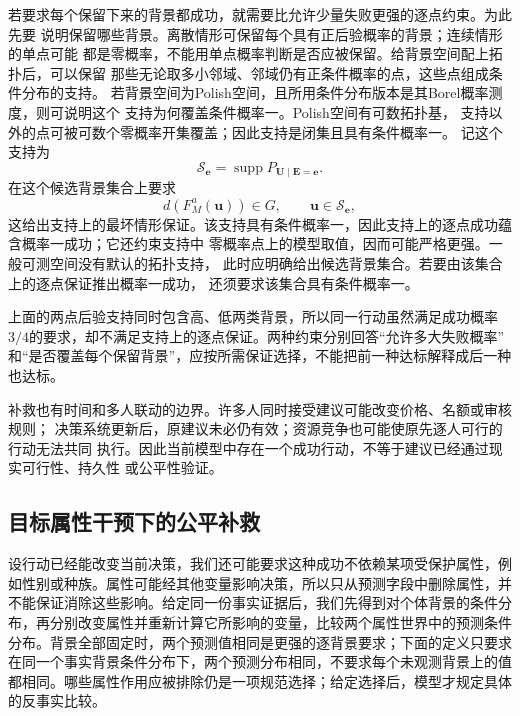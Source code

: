 若要求每个保留下来的背景都成功，就需要比允许少量失败更强的逐点约束。为此先要
说明保留哪些背景。离散情形可保留每个具有正后验概率的背景；连续情形的单点可能
都是零概率，不能用单点概率判断是否应被保留。给背景空间配上拓扑后，可以保留
那些无论取多小邻域、邻域仍有正条件概率的点，这些点组成条件分布的支持。
若背景空间为Polish空间，且所用条件分布版本是其Borel概率测度，则可说明这个
支持为何覆盖条件概率一。Polish空间有可数拓扑基，
支持以外的点可被可数个零概率开集覆盖；因此支持是闭集且具有条件概率一。
记这个支持为
\[
  \mathcal S_{\bm e}
  =\operatorname{supp}P_{\bm U\mid\bm E=\bm e}.
\]
在这个候选背景集合上要求
\begin{equation}
  d(F_M^a(\bm u))\in G,\qquad \bm u\in\mathcal S_{\bm e},
  \label{eq:causal-recourse-robust}
\end{equation}
这给出支持上的最坏情形保证。该支持具有条件概率一，因此支持上的逐点成功蕴含概率一成功；它还约束支持中
零概率点上的模型取值，因而可能严格更强。一般可测空间没有默认的拓扑支持，
此时应明确给出候选背景集合。若要由该集合上的逐点保证推出概率一成功，
还须要求该集合具有条件概率一。

上面的两点后验支持同时包含高、低两类背景，所以同一行动虽然满足成功概率
\(3/4\)的要求，却不满足支持上的逐点保证。两种约束分别回答“允许多大失败概率”
和“是否覆盖每个保留背景”，应按所需保证选择，不能把前一种达标解释成后一种也达标。

补救也有时间和多人联动的边界。许多人同时接受建议可能改变价格、名额或审核规则；
决策系统更新后，原建议未必仍有效；资源竞争也可能使原先逐人可行的行动无法共同
执行。因此当前模型中存在一个成功行动，不等于建议已经通过现实可行性、持久性
或公平性验证。

\subsection{目标属性干预下的公平补救}
\label{sec:causal-fair-recourse}

设行动已经能改变当前决策，我们还可能要求这种成功不依赖某项受保护属性，例如性别或种族。属性可能经其他变量影响决策，所以只从预测字段中删除属性，并不能保证消除这些影响。给定同一份事实证据后，我们先得到对个体背景的条件分布，再分别改变属性并重新计算它所影响的变量，比较两个属性世界中的预测条件分布。背景全部固定时，两个预测值相同是更强的逐背景要求；下面的定义只要求在同一个事实背景条件分布下，两个预测分布相同，不要求每个未观测背景上的值都相同。哪些属性作用应被排除仍是一项规范选择；给定选择后，模型才规定具体的反事实比较。

